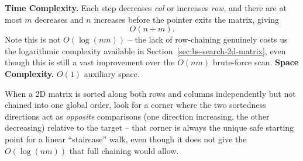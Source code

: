 \begin{complexitybox}
\textbf{Time Complexity.} Each step decreases \textit{col} or increases
\textit{row}, and there are at most $m$ decreases and $n$ increases before
the pointer exits the matrix, giving
\[
  O(n+m).
\]
Note this is not $O(\log(nm))$ -- the lack of row-chaining genuinely costs
us the logarithmic complexity available in
Section~\ref{sec:bs-search-2d-matrix}, even though this is still a vast
improvement over the $O(nm)$ brute-force scan.
\textbf{Space Complexity.} $O(1)$ auxiliary space.
\end{complexitybox}

\begin{takeawaybox}
When a 2D matrix is sorted along both rows and columns independently but
not chained into one global order, look for a corner where the two
sortedness directions act as \emph{opposite} comparisons (one direction
increasing, the other decreasing) relative to the target -- that corner is
always the unique safe starting point for a linear ``staircase'' walk,
even though it does not give the $O(\log(nm))$ that full chaining would
allow.
\end{takeawaybox}
